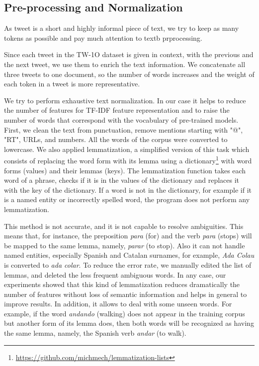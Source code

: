 \documentclass[10pt, a4paper]{article}
\begin{document}
\subsection{Pre-processing and Normalization}

As  tweet is a short and highly informal piece of text, we try to keep as many tokens as possible and pay much attention to textb prprocessing.  

Since each tweet in the TW-1O dataset is given in context, with the previous and the next tweet, we use them to enrich the text information. We concatenate all three tweets to one document, so the number of words increases and the weight of each token in a tweet is more representative.   

We try to perform exhaustive text normalization. In our case it helps to reduce the number of features for TF-IDF feature representation and to raise the number of words that correspond with the vocabulary of pre-trained models. First, we clean the text from punctuation, remove mentions starting with "@", "RT", URLs, and numbers. All the words of the corpus were converted to lowercase. We also applied lemmatization, a simplified version of this task which consists of replacing the word form with its lemma using a dictionary\footnote{\url{https://github.com/michmech/lemmatization-lists}} with word forms (values) and their lemmas (keys). The lemmatization function takes each word of a phrase, checks if it is in the values of the dictionary and replaces it with the key of the dictionary. If a word is not in the dictionary, for example if it is a named entity or incorrectly spelled word, the program does not perform any lemmatization. 

This method is not accurate, and it is not capable to resolve ambiguities. This means that, for instance, the preposition \textit{para} (for) and the verb \textit{para} (stops) will be mapped to the same lemma, namely, \textit{parar} (to stop). Also it can not handle named entities, especially Spanish and Catalan surnames, for example, \textit{Ada Colau} is converted to \textit{ada colar}. To reduce the error rate, we manually edited the list of lemmas, and deleted the less frequent ambiguous words. In any case, our experiments showed that this kind of lemmatization reduces dramatically the number of features without loss of semantic information and helps in general to improve results. In addition, it allows to deal with some unseen words. For example, if the word \textit{andando} (walking) does not appear in the training corpus but another form of its lemma does, then both words will be recognized as having the same lemma, namely, the Spanish verb \textit{andar} (to walk).
\end{document}
